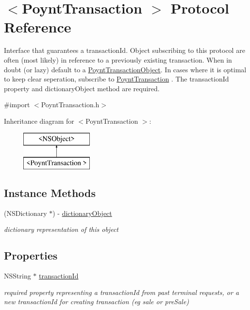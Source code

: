 \hypertarget{protocol_poynt_transaction_01-p}{}\section{$<$Poynt\+Transaction $>$ Protocol Reference}
\label{protocol_poynt_transaction_01-p}


Interface that guarantees a {\ttfamily transaction\+Id}. Object subscribing to this protocol are often (most likely) in reference to a previously existing transaction. When in doubt (or lazy) default to a \hyperlink{interface_poynt_transaction_object}{Poynt\+Transaction\+Object}. In cases where it is optimal to keep clear seperation, subscribe to \hyperlink{class_poynt_transaction-p}{Poynt\+Transaction} . The transaction\+Id property and dictionary\+Object method are required.  




{\ttfamily \#import $<$Poynt\+Transaction.\+h$>$}

Inheritance diagram for $<$Poynt\+Transaction $>$\+:\begin{figure}[H]
\begin{center}
\leavevmode
\includegraphics[height=2.000000cm]{protocol_poynt_transaction_01-p}
\end{center}
\end{figure}
\subsection*{Instance Methods}
\begin{DoxyCompactItemize}
\item 
(N\+S\+Dictionary $\ast$) -\/ \hyperlink{protocol_poynt_transaction_01-p_a2482f2e9af7fe8eec4ba9710cdc963ee}{dictionary\+Object}
\begin{DoxyCompactList}\small\item\em dictionary representation of this object \end{DoxyCompactList}\end{DoxyCompactItemize}
\subsection*{Properties}
\begin{DoxyCompactItemize}
\item 
N\+S\+String $\ast$ \hyperlink{protocol_poynt_transaction_01-p_aacd11580c330a78310c344d78baecf8c}{transaction\+Id}
\begin{DoxyCompactList}\small\item\em required property representing a transaction\+Id from past terminal requests, or a new transaction\+Id for creating transaction (eg sale or pre\+Sale) \end{DoxyCompactList}\end{DoxyCompactItemize}


